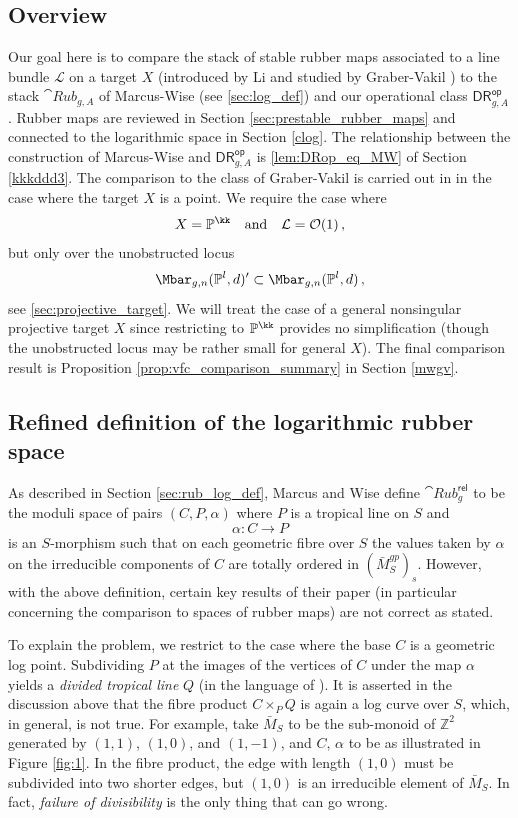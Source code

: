 \documentclass[a4paper,12pt]{article} %
\newcommand{\MWvone}[1]{}%
\newcommand{\MWref}[1]{#1}
\newcommand{\bb}[1]{{\mathbb{#1}}}
\newcommand{\ca}[1]{{\mathcal{#1}}}
\theoremstyle{definition}
\theoremstyle{plain}%
\newcommand{\DRop}{\mathsf{DR}^{\mathsf{op}}}
\begin{document}
\subsection{Overview}
Our goal here is to compare the stack of stable rubber maps 
associated to a line bundle $\ca L$ on a target $X$   (introduced by Li \cite{Li2002A-degeneration-} and studied by Graber-Vakil \cite{Graber2005Relative-virtua}) to
the stack $\cat{Rub}_{g,A}$ of Marcus-Wise (see \cref{sec:log_def}) and our operational class $\DRop_{g,A}$. 
Rubber maps are reviewed in Section \ref{sec:prestable_rubber_maps} and connected to
the logarithmic space in Section \ref{clog}.
The relationship between  the construction
of Marcus-Wise and $\DRop_{g,A}$ is 
 \cref{lem:DRop_eq_MW} of Section \ref{kkkddd3}. The comparison to the class of Graber-Vakil is carried out in \cite{Marcus2017Logarithmic-com} in the case where the target $X$ is a point. We require the case where
$$X = \bb P^\kk  \ \ \ \text{and}\ \ \  \ca L = \ca O(1)\, ,$$
but only over the unobstructed locus 
$$\Mbar_{g,n}(\bb P^l, d)' \subset \Mbar_{g,n}(\bb P^l, d)\, ,$$
see \cref{sec:projective_target}. 
We will treat the case of a general nonsingular 
projective target $X$ since restricting to $\bb P^\kk$ provides no simplification (though the unobstructed locus may be rather small for general $X$). 
The final comparison result is Proposition \ref{prop:vfc_comparison_summary} in Section \ref{mwgv}.


\subsection{Refined definition of the logarithmic rubber space}

As described in Section \ref{sec:rub_log_def}, Marcus and Wise define $\cat{Rub}^{\mathsf{rel}}_{g}$ to be the moduli space of pairs $(C,P, \alpha)$ where $P$ is a tropical line on $S$ and $$\alpha\colon C \to P$$ is an $S$-morphism such that on each geometric fibre over $S$ the values taken by $\alpha$ on the irreducible components of $C$ are totally ordered in $(\bar{M}_S^{gp})_s$. However, with the above definition, certain key results of their paper (in particular concerning the comparison to spaces of rubber maps) are not correct as stated. 

To explain the problem, we restrict to the case where the base $C$ is a geometric log point. Subdividing $P$ at the images of the vertices of $C$ under the map $\alpha$ yields a \emph{divided tropical line} $Q$ (in the language of \cite{Marcus2017Logarithmic-com}). It is asserted in the discussion above \cite[\MWref{Proposition 5.5.2}\MWvone{Proposition 5.14}]{Marcus2017Logarithmic-com} that the fibre product $C \times_P Q$ is again a log curve over $S$, which, in general,
is not true. For example, take $\bar M_S$ to be the sub-monoid of $\mathbb Z^2$ generated by $(1,1)$, $(1,0)$, and $(1,-1)$, and $C$, $\alpha$ to be as illustrated in Figure \ref{fig:1}. In the fibre product,
the edge with length $(1,0)$ must be subdivided into two shorter edges, but $(1,0)$ 
is an irreducible element of $\bar M_S$. 
In fact, {\em failure of divisibility} is the only thing that can go wrong.
\end{document}
